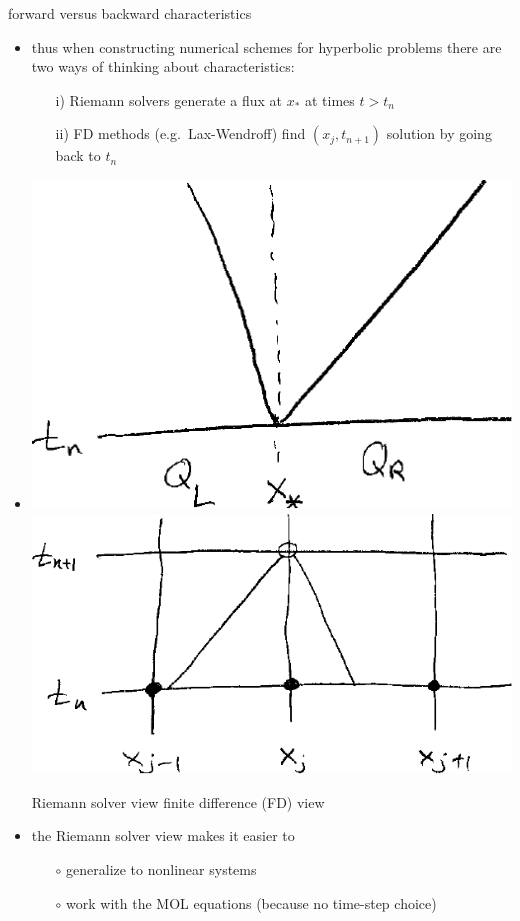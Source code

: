\documentclass[10pt,dvipsnames,usepdftitle=false,
hyperref={pdftitle = {Finite volume methods},
    pdfauthor = {Ed Bueler}}]{beamer}
\begin{document}
\begin{frame}{forward versus backward characteristics}

\begin{itemize}
\item thus when constructing numerical schemes for hyperbolic problems there are two ways of thinking about characteristics:
    \begin{itemize}
    \item[i)] Riemann solvers generate a flux at $x_*$ at times $t>t_n$
    \item[ii)] FD methods (e.g.~Lax-Wendroff) find $(x_j,t_{n+1})$ solution by going back to $t_n$
    \end{itemize}
\item 

\medskip

\includegraphics[height=0.34\textheight]{figs/rscharssketch} \hfill \includegraphics[height=0.38\textheight]{figs/fdcharssketch}

\medskip
\qquad Riemann solver view \hfill finite difference (FD) view \qquad \phantom{x}

\item the Riemann solver view makes it easier to
    \begin{itemize}
    \item[$\circ$] generalize to nonlinear systems
    \item[$\circ$] work with the MOL equations (because no time-step choice)
    \end{itemize}
\end{itemize}
\end{frame}
\end{document}
